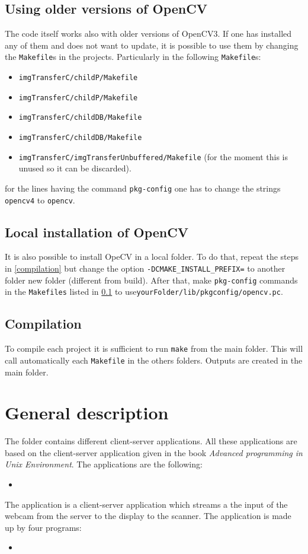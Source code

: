\documentclass[12pt, letterpaper]{article}
\theoremstyle{definition}
\let\ti\textit
\let\cd\lstinline
\begin{document}
\subsection{Using older versions of OpenCV}
\label{olderOpenCV}
The code itself works also with older versions of OpenCV3. If one has installed any of them and does not want to update, it is possible to use them by changing the \lstinline+Makefile+s in the projects. Particularly in the following \lstinline+Makefile+s:
\begin{itemize}
\item \lstinline+imgTransferC/childP/Makefile+
\item \lstinline+imgTransferC/childP/Makefile+
\item \lstinline+imgTransferC/childDB/Makefile+
\item \lstinline+imgTransferC/childDB/Makefile+
\item \lstinline+imgTransferC/imgTransferUnbuffered/Makefile+ (for the moment this is unused so it can be discarded).
\end{itemize}
for the lines having the command \lstinline+pkg-config+ one has to change the strings \lstinline+opencv4+ to \lstinline+opencv+.

\subsection{Local installation of OpenCV}
It is also possible to install OpeCV in a local folder. To do that, repeat the steps in \ref{compilation} but change the option \lstinline+-DCMAKE_INSTALL_PREFIX=+ to another folder new folder (different from build). After that, make \lstinline+pkg-config+ commands in the  \lstinline+Makefiles+ listed in \ref{olderOpenCV} to use\lstinline+yourFolder/lib/pkgconfig/opencv.pc+.

\subsection{Compilation}
To compile each project it is sufficient to run \cd+make+ from the main folder. This will call automatically each \cd+Makefile+ in the others folders. Outputs are created in the main folder.

\section{General description}
The folder contains different client-server applications. All these applications are based on the client-server application given in the book \ti{Advanced programming in Unix Environment}. The applications are the following:
\begin{itemize}
\item
\end{itemize}

The application is a client-server application which streams a the input of the webcam from the server to the display to the scanner. The application is made up by four programs:
\begin{itemize}
\item
\end{itemize}
\end{document}
